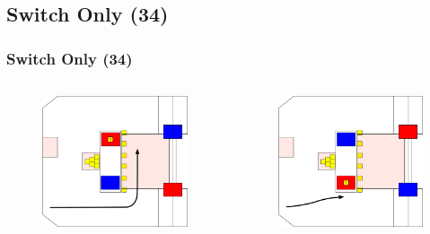 \documentclass{beamer}
\begin{document}
\subsection{Switch Only (34)}

\begin{frame}
 \frametitle{Switch Only \alert{(34)}}
 \begin{columns}
  \begin{figure}
   \includegraphics[scale=0.15]{assets/paths/34_LR}
  \end{figure}
  \begin{figure}
   \includegraphics[scale=0.15]{assets/paths/34_RL}

\end{figure}
\end{columns}
\end{frame}
\end{document}
